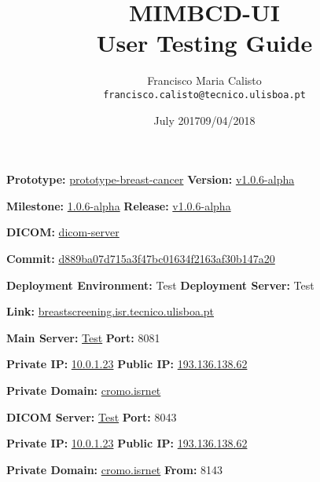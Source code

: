 \documentclass{article}
\title{
MIMBCD-UI
\\
User Testing Guide
}
\author{
  Francisco Maria Calisto\\
  \texttt{francisco.calisto@tecnico.ulisboa.pt}
}
\date{July 2017}
\date{09/04/2018}
\begin{document}
\maketitle

\textbf{Prototype:} \hyperlink{https://github.com/MIMBCD-UI/prototype-breast-cancer}{prototype-breast-cancer} \hfill \textbf{Version:} \hyperlink{https://github.com/MIMBCD-UI/prototype-breast-screening/tree/d88150f25a70153444d185c5eb6c6e99f9b6108a}{v1.0.6-alpha}

\textbf{Milestone:} \hyperlink{https://github.com/MIMBCD-UI/prototype-breast-screening/milestone/6}{1.0.6-alpha} \hfill \textbf{Release:} \hyperlink{https://github.com/MIMBCD-UI/prototype-breast-screening/releases/tag/v1.0.6-alpha}{v1.0.6-alpha}

\hfill

\textbf{DICOM:} \hyperlink{https://github.com/MIMBCD-UI/dicom-server}{dicom-server}

\textbf{Commit:} \hyperlink{https://github.com/MIMBCD-UI/dicom-server/tree/d889ba07d715a3f47bc01634f2163af30b147a20}{d889ba07d715a3f47bc01634f2163af30b147a20}

\hfill

\textbf{Deployment Environment:} Test \hfill \textbf{Deployment Server:} Test

\textbf{Link:} \hyperlink{breastscreening.isr.tecnico.ulisboa.pt}{breastscreening.isr.tecnico.ulisboa.pt}

\hfill

\textbf{Main Server:} \hyperlink{http://breastscreening.isr.tecnico.ulisboa.pt:8081/src/public/index.html}{Test} \hfill \textbf{Port:} 8081

\textbf{Private IP:} \hyperlink{http://10.0.1.23:8081/src/public/index.html}{10.0.1.23} \hfill \textbf{Public IP:} \hyperlink{http://193.136.138.62:8081/src/public/index.html}{193.136.138.62}

\textbf{Private Domain:} \hyperlink{http://cromo.isrnet:8081/src/public/index.html}{cromo.isrnet}

\hfill

\textbf{DICOM Server:} \hyperlink{http://breastscreening.isr.tecnico.ulisboa.pt:8043/app/explorer.html}{Test} \hfill \textbf{Port:} 8043

\textbf{Private IP:} \hyperlink{http://10.0.1.23:8043/app/explorer.html}{10.0.1.23} \hfill \textbf{Public IP:} \hyperlink{http://193.136.138.62:8043/app/explorer.html}{193.136.138.62}

\textbf{Private Domain:} \hyperlink{http://cromo.isrnet:8043/app/explorer.html}{cromo.isrnet} \hfill \textbf{From:} 8143

\clearpage









\clearpage



\end{document}
